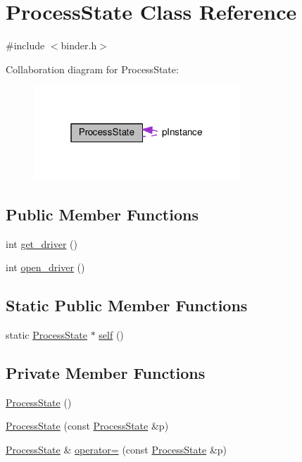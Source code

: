 \hypertarget{classProcessState}{\section{Process\-State Class Reference}
\label{classProcessState}
}


{\ttfamily \#include $<$binder.\-h$>$}



Collaboration diagram for Process\-State\-:
\nopagebreak
\begin{figure}[H]
\begin{center}
\leavevmode
\includegraphics[width=220pt]{classProcessState__coll__graph}
\end{center}
\end{figure}
\subsection*{Public Member Functions}
\begin{DoxyCompactItemize}
\item 
int \hyperlink{classProcessState_ac89b9be4c5b62a0b4e0f9463b2cd5869}{get\-\_\-driver} ()
\item 
int \hyperlink{classProcessState_a466345e31d9732633daec40ae1143cef}{open\-\_\-driver} ()
\end{DoxyCompactItemize}
\subsection*{Static Public Member Functions}
\begin{DoxyCompactItemize}
\item 
static \hyperlink{classProcessState}{Process\-State} $\ast$ \hyperlink{classProcessState_a99f5eba7ab8777b26ebd837df67650f5}{self} ()
\end{DoxyCompactItemize}
\subsection*{Private Member Functions}
\begin{DoxyCompactItemize}
\item 
\hyperlink{classProcessState_a8359bb3ef4cb5c1ee1488757bf9d3b09}{Process\-State} ()
\item 
\hyperlink{classProcessState_a30cb15be9a906cf31816bd20ae452ab5}{Process\-State} (const \hyperlink{classProcessState}{Process\-State} \&p)
\item 
\hyperlink{classProcessState}{Process\-State} \& \hyperlink{classProcessState_a4ec70d27d0d7d45781809f71589ed1a5}{operator=} (const \hyperlink{classProcessState}{Process\-State} \&p)
\end{DoxyCompactItemize}

